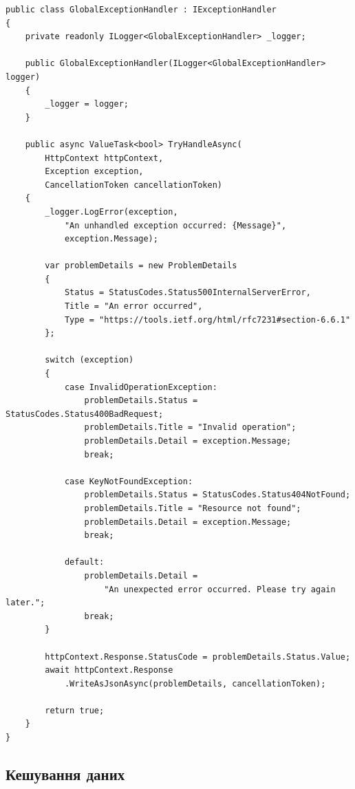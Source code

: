 \documentclass[14pt,a4paper]{extarticle}
\begin{document}
\begin{lstlisting}[language={[Sharp]C}, caption=Global Exception Handler, basicstyle=\small\ttfamily, breaklines=true, frame=single]
public class GlobalExceptionHandler : IExceptionHandler
{
    private readonly ILogger<GlobalExceptionHandler> _logger;
    
    public GlobalExceptionHandler(ILogger<GlobalExceptionHandler> logger)
    {
        _logger = logger;
    }
    
    public async ValueTask<bool> TryHandleAsync(
        HttpContext httpContext,
        Exception exception,
        CancellationToken cancellationToken)
    {
        _logger.LogError(exception, 
            "An unhandled exception occurred: {Message}", 
            exception.Message);
        
        var problemDetails = new ProblemDetails
        {
            Status = StatusCodes.Status500InternalServerError,
            Title = "An error occurred",
            Type = "https://tools.ietf.org/html/rfc7231#section-6.6.1"
        };
        
        switch (exception)
        {
            case InvalidOperationException:
                problemDetails.Status = StatusCodes.Status400BadRequest;
                problemDetails.Title = "Invalid operation";
                problemDetails.Detail = exception.Message;
                break;
                
            case KeyNotFoundException:
                problemDetails.Status = StatusCodes.Status404NotFound;
                problemDetails.Title = "Resource not found";
                problemDetails.Detail = exception.Message;
                break;
                
            default:
                problemDetails.Detail = 
                    "An unexpected error occurred. Please try again later.";
                break;
        }
        
        httpContext.Response.StatusCode = problemDetails.Status.Value;
        await httpContext.Response
            .WriteAsJsonAsync(problemDetails, cancellationToken);
        
        return true;
    }
}
\end{lstlisting}

\newpage
\subsection{Кешування даних}
\end{document}
